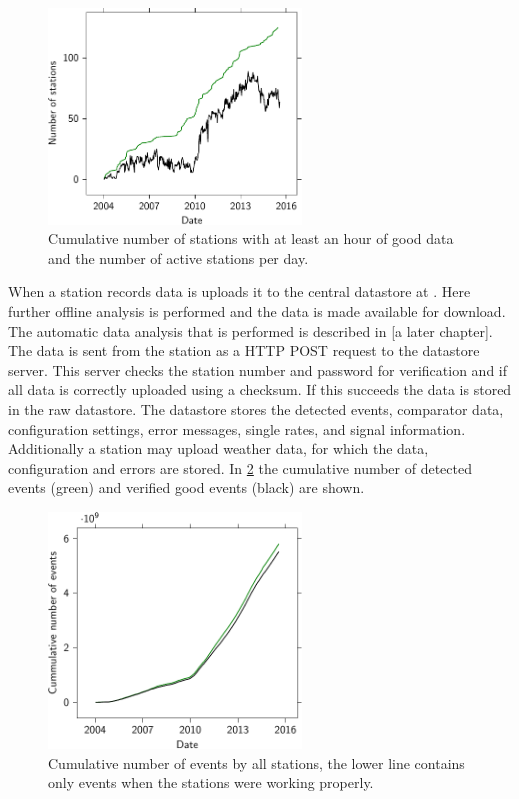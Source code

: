 \begin{figure}
    \centering
    \includegraphics[width=0.6\textwidth]
                    {plots/experiment/active_stations}
    \caption{Cumulative number of stations with at least an hour of good data and the number of active stations per day.}
    \label{fig:active_stations}
\end{figure}

When a station records data is uploads it to the central datastore at \nikhef. Here further offline analysis is performed and the data is made available for download. The automatic data analysis that is performed is described in [a later chapter]. The data is sent from the station as a HTTP POST request to the datastore server. This server checks the station number and password for verification and if all data is correctly uploaded using a checksum. If this succeeds the data is stored in the raw datastore. The datastore stores the detected events, comparator data, configuration settings, error messages, single rates, and \gps signal information. Additionally a station may upload weather data, for which the data, configuration and errors are stored. In \cref{fig:luminosity_network} the cumulative number of detected events (green) and verified good events (black) are shown.

\begin{figure}
    \centering
    \includegraphics[width=0.6\textwidth]
                    {plots/experiment/luminosity_network}
    \caption{Cumulative number of events by all stations, the lower line contains only events when the stations were working properly.}
    \label{fig:luminosity_network}
\end{figure}

